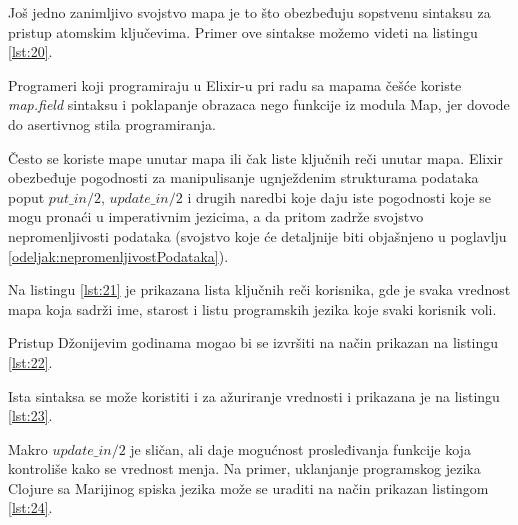 \documentclass[12pt,oneside]{memoir}
\begin{document}


Još jedno zanimljivo svojstvo mapa je to što obezbeđuju sopstvenu sintaksu za pristup atomskim ključevima. Primer ove sintakse možemo videti na listingu \ref{lst:20}.



\noindent Programeri koji programiraju u Elixir-u pri radu sa mapama češće koriste \textit{map.field} sintaksu i poklapanje obrazaca nego funkcije iz modula Map, jer dovode do asertivnog stila programiranja.

Često se koriste mape unutar mapa ili čak liste ključnih reči unutar mapa. Elixir obezbeđuje pogodnosti za manipulisanje ugnježdenim strukturama podataka poput $put\_in/2$, $update\_in/2$ i drugih naredbi koje daju iste pogodnosti koje se mogu pronaći u imperativnim jezicima, a da pritom zadrže svojstvo nepromenljivosti podataka (svojstvo koje će detaljnije biti objašnjeno u poglavlju \ref{odeljak:nepromenljivostPodataka}).

Na listingu \ref{lst:21} je prikazana lista ključnih reči korisnika, gde je svaka vrednost mapa koja sadrži ime, starost i listu programskih jezika koje svaki korisnik voli.



\noindent Pristup Džonijevim godinama mogao bi se izvršiti na način prikazan na listingu \ref{lst:22}.



\noindent Ista sintaksa se može koristiti i za ažuriranje vrednosti i prikazana je na listingu \ref{lst:23}.



Makro $update\_in/2$ je sličan, ali daje mogućnost prosleđivanja funkcije koja kontroliše kako se vrednost menja. Na primer, uklanjanje programskog jezika Clojure sa Marijinog spiska jezika može se uraditi na način prikazan listingom \ref{lst:24}.


\end{document}
